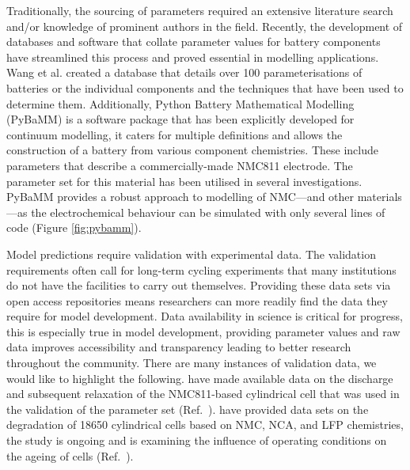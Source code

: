 \documentclass[journal=jacsat,manuscript=article]{achemso}
\begin{document}
Traditionally, the sourcing of parameters required an extensive literature search and/or knowledge of prominent authors in the field. 
Recently, the development of databases and software that collate parameter values for battery components have streamlined this process and proved essential in modelling applications. \cite{Tranter2020,Tranter_2020b} 
Wang et al. created a database that details over 100 parameterisations of batteries or the individual components and the techniques that have been used to determine them. 
Additionally, Python Battery Mathematical Modelling (PyBaMM) is a software package that has been explicitly developed for continuum modelling, it caters for multiple definitions and allows the construction of a battery from various component chemistries.\cite{Sulzer_2020} 
These include parameters that describe a commercially-made NMC811 electrode.\cite{Chen2020} 
The parameter set for this material has been utilised in several investigations.\cite{Tranter2020,Tranter_2020b} 
PyBaMM provides a robust approach to modelling of NMC—and other materials—as the electrochemical behaviour can be simulated with only several lines of code (Figure \ref{fig:pybamm}).

Model predictions require validation with experimental data. 
The validation requirements often call for long-term cycling experiments that many institutions do not have the facilities to carry out themselves. 
Providing these data sets via open access repositories means researchers can more readily find the data they require for model development. 
Data availability in science is critical for progress, this is especially true in model development, providing parameter values and raw data improves accessibility and transparency leading to better research throughout the community. 
There are many instances of validation data, we would like to highlight the following. 
\citeauthor{Chen2020} have made available data on the discharge and subsequent relaxation of the NMC811-based cylindrical cell that was used in the validation of the parameter set (Ref.~). \cite{Chen2020}
\citeauthor{Devie_2018} have provided data sets on the degradation of 18650 cylindrical cells based on NMC, NCA, and LFP chemistries, the study is ongoing and is examining the influence of operating conditions on the ageing of cells (Ref.~). \cite{Devie_2018}
\end{document}
